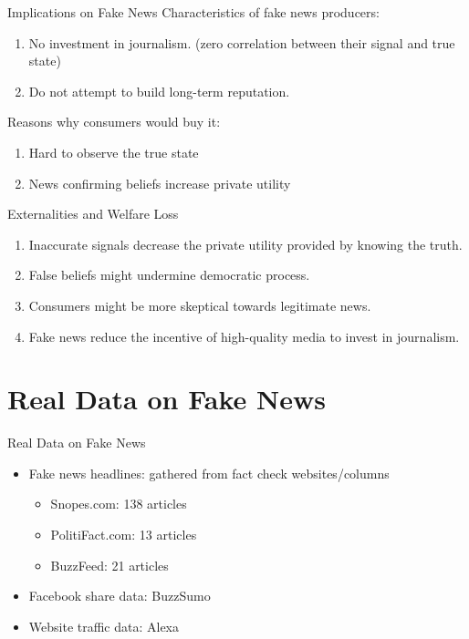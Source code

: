 \documentclass[
  10pt,
  ignorenonframetext,
  aspectratio=43,
]{beamer}
\providecommand{\tightlist}{%
  \setlength{\itemsep}{0pt}\setlength{\parskip}{0pt}}
\begin{document}
\begin{frame}{Implications on Fake News}
\protect\hypertarget{implications-on-fake-news}{}
Characteristics of fake news producers:

\begin{enumerate}
\tightlist
\item
  No investment in journalism. (zero correlation between their signal
  and true state)
\item
  Do not attempt to build long-term reputation.
\end{enumerate}

Reasons why consumers would buy it:

\begin{enumerate}
\tightlist
\item
  Hard to observe the true state
\item
  News confirming beliefs increase private utility
\end{enumerate}
\end{frame}

\begin{frame}
\begin{block}{Externalities and Welfare Loss}
\protect\hypertarget{externalities-and-welfare-loss}{}
\begin{enumerate}
\tightlist
\item
  Inaccurate signals decrease the private utility provided by knowing
  the truth.
\item
  False beliefs might undermine democratic process.
\item
  Consumers might be more skeptical towards legitimate news.
\item
  Fake news reduce the incentive of high-quality media to invest in
  journalism.
\end{enumerate}
\end{block}
\end{frame}

\hypertarget{real-data-on-fake-news}{%
\section{Real Data on Fake News}\label{real-data-on-fake-news}}

\begin{frame}{Real Data on Fake News}
\begin{itemize}
\tightlist
\item
  Fake news headlines: gathered from fact check websites/columns

  \begin{itemize}
  \tightlist
  \item
    Snopes.com: 138 articles
  \item
    PolitiFact.com: 13 articles
  \item
    BuzzFeed: 21 articles
  \end{itemize}
\item
  Facebook share data: BuzzSumo
\item
  Website traffic data: Alexa
\end{itemize}
\end{frame}
\end{document}
